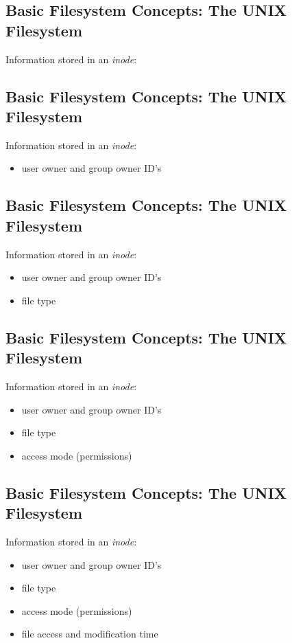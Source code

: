 \documentclass[xga]{xdvislides}
\begin{document}
\subsection{Basic Filesystem Concepts: The UNIX Filesystem}
Information stored in an {\em inode}:

\subsection{Basic Filesystem Concepts: The UNIX Filesystem}
Information stored in an {\em inode}:
\begin{itemize}
	\item user owner and group owner ID's
\end{itemize}

\subsection{Basic Filesystem Concepts: The UNIX Filesystem}
Information stored in an {\em inode}:
\begin{itemize}
	\item user owner and group owner ID's
	\item file type
\end{itemize}

\subsection{Basic Filesystem Concepts: The UNIX Filesystem}
Information stored in an {\em inode}:
\begin{itemize}
	\item user owner and group owner ID's
	\item file type
	\item access mode (permissions)
\end{itemize}

\subsection{Basic Filesystem Concepts: The UNIX Filesystem}
Information stored in an {\em inode}:
\begin{itemize}
	\item user owner and group owner ID's
	\item file type
	\item access mode (permissions)
	\item file access and modification time
\end{itemize}
\end{document}
